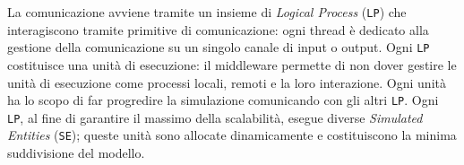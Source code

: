 \begin{table}[H]
    \caption{Overhead (e ritardo) di copertura per ciascun algoritmo per una rete di $500$ nodi, $1000$ archi, diametro to $10$, \texttt{TTL}$=16$ e cache fissa a $256$ simulata tramite \textit{LUNES}}
\end{table}
La comunicazione avviene tramite un insieme di \textit{Logical Process} (\texttt{LP}) che interagiscono tramite primitive di comunicazione: ogni thread è dedicato alla gestione della comunicazione su un singolo canale di input o output. Ogni \texttt{LP} costituisce una unità di esecuzione: il middleware permette di non dover gestire le unità di esecuzione come processi locali, remoti e la loro interazione. Ogni unità ha lo scopo di far progredire la simulazione comunicando con gli altri \texttt{LP}. Ogni \texttt{LP}, al fine di garantire il massimo della scalabilità, esegue diverse \textit{Simulated Entities} (\texttt{SE}); queste unità sono allocate dinamicamente e costituiscono la minima suddivisione del modello.\newline
